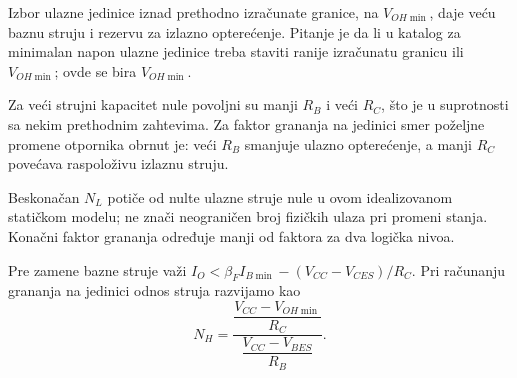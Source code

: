Izbor ulazne jedinice iznad prethodno izračunate granice, na $V_{OH\min}$, daje veću baznu struju i rezervu za izlazno opterećenje. Pitanje je da li u katalog za minimalan napon ulazne jedinice treba staviti ranije izračunatu granicu ili $V_{OH\min}$; ovde se bira $V_{OH\min}$.

Za veći strujni kapacitet nule povoljni su manji $R_B$ i veći $R_C$, što je u suprotnosti sa nekim prethodnim zahtevima. Za faktor grananja na jedinici smer poželjne promene otpornika obrnut je: veći $R_B$ smanjuje ulazno opterećenje, a manji $R_C$ povećava raspoloživu izlaznu struju.

Beskonačan $N_L$ potiče od nulte ulazne struje nule u ovom idealizovanom statičkom modelu; ne znači neograničen broj fizičkih ulaza pri promeni stanja. Konačni faktor grananja određuje manji od faktora za dva logička nivoa.

Pre zamene bazne struje važi $I_O<\beta_FI_{B\min}-(V_{CC}-V_{CES})/R_C$. Pri računanju grananja na jedinici odnos struja razvijamo kao
\[N_H=\frac{\dfrac{V_{CC}-V_{OH\min}}{R_C}}{\dfrac{V_{CC}-V_{BES}}{R_B}}.\]
